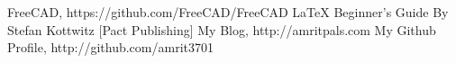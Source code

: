 \begin{thebibliography}{9}
\bibitem{} FreeCAD, https://github.com/FreeCAD/FreeCAD
\bibitem{} \LaTeX{} Beginner's Guide By Stefan Kottwitz [Pact Publishing]
\bibitem{} My Blog, http://amritpals.com
\bibitem{} My Github Profile, http://github.com/amrit3701
\end{thebibliography}

